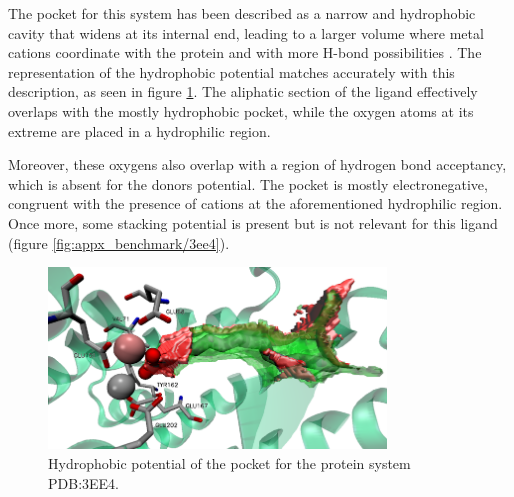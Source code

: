       The pocket for this system has been described as a narrow and hydrophobic cavity that widens at its internal end, leading to a larger volume where metal cations coordinate with the protein and with more H-bond possibilities \cite{benchmark_hydrophobic_2009}. The representation of the hydrophobic potential matches accurately with this description, as seen in figure \ref{fig:benchmark/3ee4}. The aliphatic section of the ligand effectively overlaps with the mostly hydrophobic pocket, while the oxygen atoms at its extreme are placed in a hydrophilic region.

      Moreover, these oxygens also overlap with a region of hydrogen bond acceptancy, which is absent for the donors potential. The pocket is mostly electronegative, congruent with the presence of cations at the aforementioned hydrophilic region. Once more, some stacking potential is present but is not relevant for this ligand (figure \ref{fig:appx_benchmark/3ee4}).

      \begin{figure}[H]
        \centering
        \includegraphics[width=0.8\textwidth]{figures/results/benchmark_prot/3ee4.png}
        \caption{\label{fig:benchmark/3ee4} Hydrophobic potential of the pocket for the protein system PDB:3EE4.}
      \end{figure}
    \pagebreak

